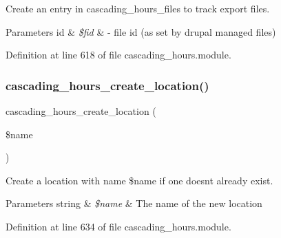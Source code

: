 Create an entry in cascading\+\_\+hours\+\_\+files to track export files. 


\begin{DoxyParams}[1]{Parameters}
id & {\em \$fid} & -\/ file id (as set by drupal managed files) \\
\hline
\end{DoxyParams}


Definition at line 618 of file cascading\+\_\+hours.\+module.

\mbox{\label{cascading__hours_8module_a7f2df49e7c04411f74138cc54e196fea_a7f2df49e7c04411f74138cc54e196fea}} 
\subsubsection{\texorpdfstring{cascading\+\_\+hours\+\_\+create\+\_\+location()}{cascading\_hours\_create\_location()}}
{\footnotesize\ttfamily cascading\+\_\+hours\+\_\+create\+\_\+location (\begin{DoxyParamCaption}\item[{}]{\$name }\end{DoxyParamCaption})}



Create a location with name \$name if one doesn\textquotesingle{}t already exist. 


\begin{DoxyParams}[1]{Parameters}
string & {\em \$name} & The name of the new location \\
\hline
\end{DoxyParams}


Definition at line 634 of file cascading\+\_\+hours.\+module.

\mbox{\label{cascading__hours_8module_a24a585afee47ad45417aa6d2b56cf64d_a24a585afee47ad45417aa6d2b56cf64d}} 
